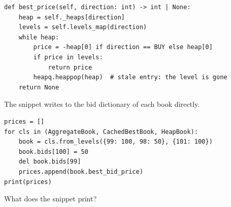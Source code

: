\begin{question}
\begin{lstlisting}[caption={\protect\codehl{unito26.lob.orderbook.HeapBook}: the constructor, the write and the best price, a comment cut.}, label=listing.bypassedWritesOnThreeBooksHeap]
def best_price(self, direction: int) -> int | None:
    heap = self._heaps[direction]
    levels = self.levels_map(direction)
    while heap:
        price = -heap[0] if direction == BUY else heap[0]
        if price in levels:
            return price
        heapq.heappop(heap)  # stale entry: the level is gone
    return None
\end{lstlisting}
The snippet writes to the bid dictionary of each book directly.
\begin{lstlisting}[caption={Two writes past \protect\codehl{set\_size}}, label=listing.bypassedWritesOnThreeBooksRun]
prices = []
for cls in (AggregateBook, CachedBestBook, HeapBook):
    book = cls.from_levels({99: 100, 98: 50}, {101: 100})
    book.bids[100] = 50
    del book.bids[99]
    prices.append(book.best_bid_price)
print(prices)
\end{lstlisting}
What does the snippet print?
\begin{choices}
 \choice \codehl{[100, 100, 100]}
 \choice \codehl{[100, 99, 100]}
 \choice \codehl{[100, 99, 99]}
 \correctchoice \codehl{[100, 99, 98]}
 \choice \codehl{[100, 98, 98]}
\end{choices}
\end{question}

